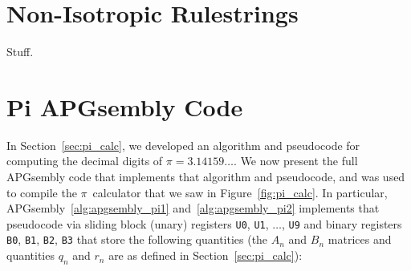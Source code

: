 \section{Non-Isotropic Rulestrings}\label{sec:non_isotropic_rulestrings}

Stuff.
%


\section{Pi APGsembly Code}\label{sec:appendix_apg}

In Section~\ref{sec:pi_calc}, we developed an algorithm and pseudocode for computing the decimal digits of $\pi = 3.14159\ldots$. We now present the full APGsembly code that implements that algorithm and pseudocode, and was used to compile the $\pi$~calculator that we saw in Figure~\ref{fig:pi_calc}. In particular, APGsembly~\ref{alg:apgsembly_pi1} and~\ref{alg:apgsembly_pi2} implements that pseudocode via sliding block (unary) registers \texttt{U0}, \texttt{U1}, $\ldots$, \texttt{U9} and binary registers \texttt{B0}, \texttt{B1}, \texttt{B2}, \texttt{B3} that store the following quantities (the $A_n$ and $B_n$ matrices and quantities $q_n$ and $r_n$ are as defined in Section~\ref{sec:pi_calc}):\medskip

